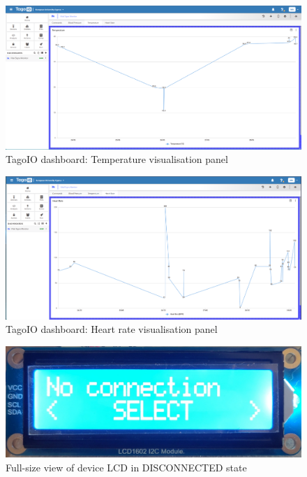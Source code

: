 \newpage
\begin{landscape}
\begin{figure}[H]
	\centering
	\includegraphics[width=\linewidth]{images/tagoio_dashboard_temp}
	\caption{TagoIO dashboard: Temperature visualisation panel}
	\label{appendix:tagoio_temp}
\end{figure}
\end{landscape}

\newpage
\begin{landscape}
\begin{figure}[H]
	\centering
	\includegraphics[width=\linewidth]{images/tagoio_dashboard_hr}
	\caption{TagoIO dashboard: Heart rate visualisation panel}
	\label{appendix:tagoio_hr}
\end{figure}
\end{landscape}

\newpage
\begin{landscape}
\begin{figure}[H]
	\centering
	\includegraphics[width=\linewidth]{images/device_ui_disconnected.jpg}
	\caption{Full-size view of device LCD in DISCONNECTED state}
	\label{appendix:ui_disconnected}
\end{figure}
\end{landscape}

